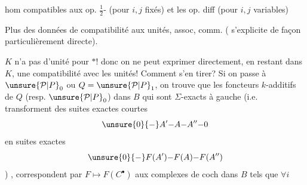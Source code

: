 hom compatibles aux op. $\tfrac12$- (pour $i,j$ fixés) et les op. diff (pour $i,j$ variables)


Plus des données de compatibilité aux unités, assoc, comm. ( s'explicite de façon particulièrement directe).

 $K$ n'a pas d'unité pour $*$! donc  on ne peut exprimer directement, en restant dans $K$, une compatibilité avec les unités! Comment s'en tirer? Si on passe à $\unsure{\mathcal P|P}_0$ ou $Q=\unsure{\mathcal P|P}_1$,  on trouve que les foncteurs $k$-additifs de $Q$ (resp. $\unsure{\mathcal P|P}_0$) dans $B$ qui sont $\Sigma$-exacts à gauche (i.e. transforment des \inserted{$\Sigma$-}suites exactes courtes
\[
\unsure{0}{-}A'{-}A{-}A''{-}0
\]
en suites exactes
\[
\unsure{0}{-}F(A'){-}F(A){-}F(A'')
\]
) , correspondent par $F\longmapsto F(C^\bullet)$ aux complexes de coch dans $B$ tels que $\forall i$ 

